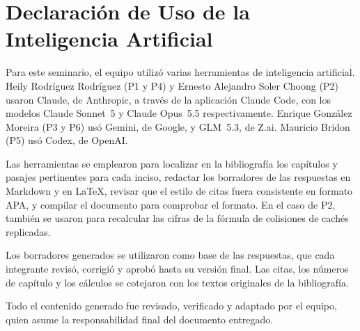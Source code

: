 
\section*{Declaración de Uso de la Inteligencia Artificial}

Para este seminario, el equipo utilizó varias herramientas de inteligencia
artificial. Heily Rodríguez Rodríguez (P1 y P4) y Ernesto Alejandro Soler
Choong (P2) usaron Claude, de Anthropic, a través de la aplicación Claude Code, con
los modelos Claude Sonnet~5 y Claude Opus~5.5 respectivamente. Enrique
González Moreira (P3 y P6) usó Gemini, de Google, y GLM~5.3, de Z.ai.
Mauricio Bridon (P5) usó Codex, de OpenAI.

Las herramientas se emplearon para localizar en la bibliografía los
capítulos y pasajes pertinentes para cada inciso, redactar los borradores de
las respuestas en Markdown y en LaTeX, revisar que el estilo de citas fuera
consistente en formato APA, y compilar el documento para comprobar el
formato. En el caso de P2, también se usaron para recalcular las cifras de la
fórmula de colisiones de cachés replicadas.

Los borradores generados se utilizaron como base de las respuestas, que cada
integrante revisó, corrigió y aprobó hasta su versión final. Las citas, los
números de capítulo y los cálculos se cotejaron con los textos originales de
la bibliografía.

Todo el contenido generado fue revisado, verificado y adaptado por el
equipo, quien asume la responsabilidad final del documento entregado.
